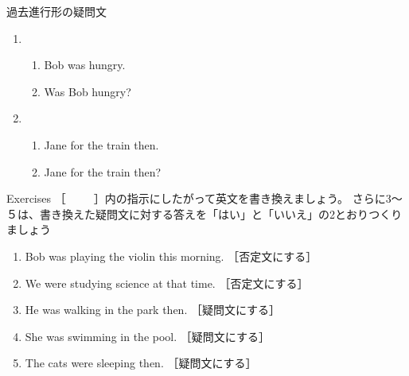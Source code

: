 \documentclass[aspectratio=169,xcolor={dvipsnames,table}]{beamer}
\begin{document}
\begin{frame}[plain]{過去進行形の疑問文}
  \begin{enumerate}
  \item \begin{enumerate}
	 \item<1-> Bob was hungry.
	 \item<2-> Was Bob hungry?
	\end{enumerate}
  \item \begin{enumerate}
	 \item<3-> Jane  for the train then.
	 \item<4->  Jane  for the train then?
	\end{enumerate}

 \end{enumerate}
\end{frame}
\begin{frame}[plain]{Exercises}
 ［~~~~~］内の指示にしたがって英文を書き換えましょう。
さらに3～５は、書き換えた疑問文に対する答えを「はい」と「いいえ」の2とおりつくりましょう
\begin{enumerate}
 \item Bob was playing the violin this morning. ［否定文にする］\\
 \item We were studying science at that time. ［否定文にする］\\
 \item He was walking in the park then. ［疑問文にする］\\
 \item She was swimming in the pool. ［疑問文にする］\\
 \item The cats were sleeping then. ［疑問文にする］\\

\end{enumerate}
\end{frame}
\end{document}
